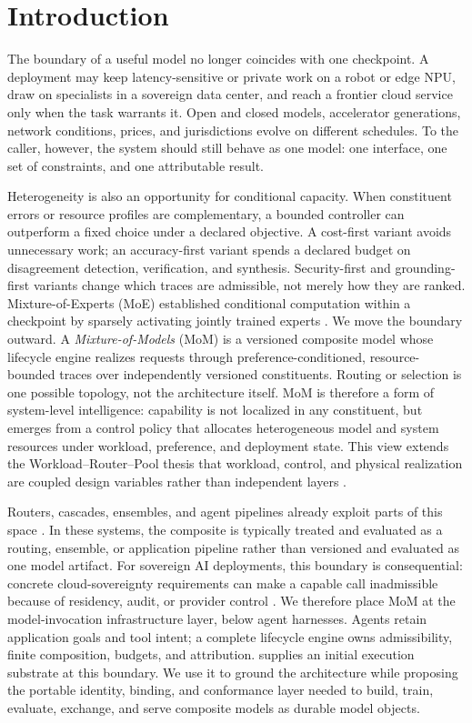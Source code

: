 \section{Introduction}
\label{sec:introduction}

The boundary of a useful model no longer coincides with one checkpoint. A
deployment may keep latency-sensitive or private work on a robot or edge NPU,
draw on specialists in a sovereign data center, and reach a frontier cloud
service only when the task warrants it. Open and closed models, accelerator
generations, network conditions, prices, and jurisdictions evolve on different
schedules. To the caller, however, the system should still behave as one model:
one interface, one set of constraints, and one attributable result.

Heterogeneity is also an opportunity for conditional capacity. When constituent
errors or resource profiles are complementary, a bounded controller can
outperform a fixed choice under a declared objective. A cost-first variant
avoids unnecessary work; an accuracy-first variant spends a declared budget on
disagreement detection, verification, and synthesis. Security-first and
grounding-first variants change which traces are admissible, not merely how
they are ranked. Mixture-of-Experts (MoE) established conditional computation
within a checkpoint by sparsely activating jointly trained experts
\citep{shazeer_2017_moe}. We move the boundary outward. A \emph{Mixture-of-Models}
(MoM) is a versioned composite model whose lifecycle engine realizes requests
through preference-conditioned, resource-bounded traces over independently
versioned constituents. Routing or selection is one possible topology, not the
architecture itself. MoM is therefore a form of system-level intelligence:
capability is not localized in any constituent, but emerges from a control
policy that allocates heterogeneous model and system resources under workload,
preference, and deployment state. This view extends the Workload--Router--Pool
thesis that workload, control, and physical realization are coupled design
variables rather than independent layers \citep{chen_2026_wrp}.

Routers, cascades, ensembles, and agent pipelines already exploit parts of this
space \citep{chen_2023_frugalgpt,ong_2024_routellm,wang_2024_moa,
kandogan_2024_compound}. In these systems, the composite is typically treated
and evaluated as a routing, ensemble, or application pipeline rather than
versioned and evaluated as one model artifact. For sovereign AI deployments,
this boundary is consequential:
concrete cloud-sovereignty requirements can make a capable call inadmissible
because of residency, audit, or provider control
\citep{european_commission_2026_sovereignty}. We therefore place MoM at the
model-invocation infrastructure layer, below agent harnesses. Agents retain
application goals and tool intent; a complete lifecycle engine owns
admissibility, finite composition, budgets, and attribution. \vsr{} supplies an
initial execution substrate at this boundary. We use it to ground the
architecture while proposing the portable identity, binding, and conformance
layer needed to build, train, evaluate, exchange, and serve composite models as
durable model objects.

